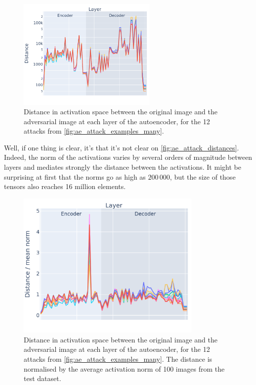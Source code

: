 \documentclass[]{scrarticle}
\begin{document}
\begin{figure}[h]
  \centering
  \includegraphics[width=0.6\textwidth]{../images/ae_attack_distances.png}
  \caption{
    Distance in activation space between the original image and the adversarial image
    at each layer of the autoencoder, for the 12 attacks from
    \autoref{fig:ae_attack_examples_many}.
  }
  \label{fig:ae_attack_distances}
\end{figure}

Well, if one thing is clear, it's that it's not clear on \autoref{fig:ae_attack_distances}.
Indeed, the norm of the activations varies by several orders of magnitude
between layers and mediates strongly the distance between the activations.
It might be surprising at first that the norms go as high as $200\,000$,
but the size of those tensors also reaches 16 million elements.

\begin{figure}[H]
  \centering
  \includegraphics[width=0.8\textwidth]{../images/ae_attack_distances_normalized.png}
  \caption{
    Distance in activation space between the original image and the adversarial image
    at each layer of the autoencoder, for the 12 attacks from
    \autoref{fig:ae_attack_examples_many}.
    The distance is normalised by the average activation norm of 100 images
    from the test dataset.
  }
  \label{fig:ae_attack_distances_normalized}
\end{figure}
\end{document}
